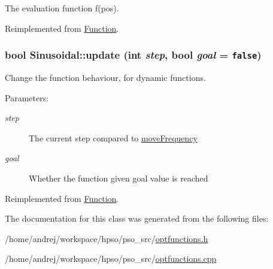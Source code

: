 The evaluation function f(pos). 



Reimplemented from \hyperlink{classFunction_159260a1fc3afa8932491e4057b6b844}{Function}.\hypertarget{classSinusoidal_c3015c343f9854389f85fe441b838f17}{
\subsubsection{\setlength{\rightskip}{0pt plus 5cm}bool Sinusoidal::update (int {\em step}, \/  bool {\em goal} = {\tt false})}}
\label{classSinusoidal_c3015c343f9854389f85fe441b838f17}


Change the function behaviour, for dynamic functions. 

\begin{Desc}
\item[Parameters: ]\par
\begin{description}
\item[{\em 
step}]The current step compared to \hyperlink{classFunction_323cbb2de44582df3b9981e6c3416980}{moveFrequency} \item[{\em 
goal}]Whether the function given goal value is reached \end{description}
\end{Desc}


Reimplemented from \hyperlink{classFunction_31bae656cf84683529a1a8c19c9f0a67}{Function}.

The documentation for this class was generated from the following files:\begin{CompactItemize}
\item 
/home/andrej/workspace/hpso/pso\_\-src/\hyperlink{optfunctions_8h}{optfunctions.h}\item 
/home/andrej/workspace/hpso/pso\_\-src/\hyperlink{optfunctions_8cpp}{optfunctions.cpp}\end{CompactItemize}
